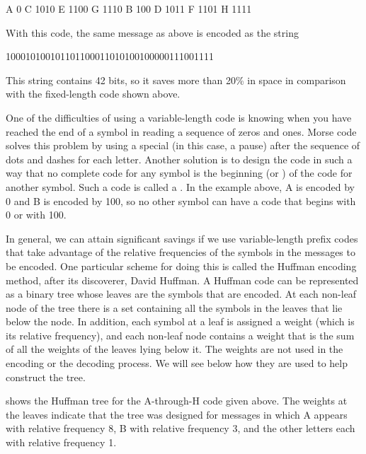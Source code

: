 \begin{example}
A 0      C 1010    E 1100    G 1110
B 100    D 1011    F 1101    H 1111
\end{example}

\noindent
With this code, the same message as above is encoded as the string

\begin{example}
100010100101101100011010100100000111001111
\end{example}

\noindent
This string contains 42 bits, so it saves more than 20\% in space in comparison
with the fixed-length code shown above.

One of the difficulties of using a variable-length code is knowing when you
have reached the end of a symbol in reading a sequence of zeros and ones.
Morse code solves this problem by using a special  (in
this case, a pause) after the sequence of dots and dashes for each letter.
Another solution is to design the code in such a way that no complete code for
any symbol is the beginning (or ) of the code for another
symbol.  Such a code is called a .  In the example above,
A is encoded by 0 and B is encoded by 100, so no other symbol can have a code
that begins with 0 or with 100.

In general, we can attain significant savings if we use variable-length prefix
codes that take advantage of the relative frequencies of the symbols in the
messages to be encoded.  One particular scheme for doing this is called the
Huffman encoding method, after its discoverer, David Huffman.  A Huffman code
can be represented as a binary tree whose leaves are the symbols that are
encoded.  At each non-leaf node of the tree there is a set containing all the
symbols in the leaves that lie below the node.  In addition, each symbol at a
leaf is assigned a weight (which is its relative frequency), and each non-leaf
node contains a weight that is the sum of all the weights of the leaves lying
below it.  The weights are not used in the encoding or the decoding process.
We will see below how they are used to help construct the tree.

 shows the Huffman tree for the A-through-H code given above.
The weights at the leaves indicate that the tree was designed for messages in
which A appears with relative frequency 8, B with relative frequency 3, and the
other letters each with relative frequency 1.

